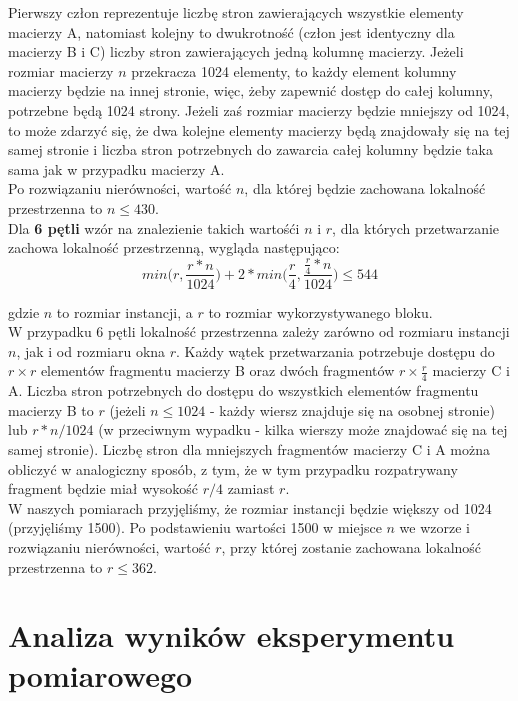 \documentclass[10pt,a4paper]{article}
\begin{document}
Pierwszy człon reprezentuje liczbę stron zawierających wszystkie elementy macierzy A, natomiast kolejny
to dwukrotność (człon jest identyczny dla macierzy B i C) liczby stron zawierających jedną kolumnę macierzy.
Jeżeli rozmiar macierzy $n$ przekracza 1024 elementy, to każdy element kolumny macierzy będzie na innej stronie,
więc, żeby zapewnić dostęp do całej kolumny, potrzebne będą 1024 strony. Jeżeli zaś rozmiar macierzy będzie
mniejszy od 1024, to może zdarzyć się, że dwa kolejne elementy macierzy będą znajdowały się na tej samej
stronie i liczba stron potrzebnych do zawarcia całej kolumny będzie taka sama jak w przypadku macierzy A.\\

Po rozwiązaniu nierówności, wartość $n$, dla której będzie zachowana lokalność przestrzenna to $n \leq 430$.
\\

Dla \textbf{6 pętli} wzór na znalezienie takich wartośći $n$ i $r$, dla których przetwarzanie zachowa
lokalność przestrzenną, wygląda następująco:
\begin{equation}
	min\Big(r, \frac{r*n}{1024}\Big) + 2*min\Big(\frac{r}{4}, \frac{\frac{r}{4} * n}{1024}\Big) \leq 544
\end{equation}

gdzie $n$ to rozmiar instancji, a $r$ to rozmiar wykorzystywanego bloku.\\

W przypadku 6 pętli lokalność przestrzenna zależy zarówno od rozmiaru instancji $n$, jak i od rozmiaru
okna $r$. Każdy wątek przetwarzania potrzebuje dostępu do $r \times r$ elementów fragmentu macierzy B oraz
dwóch fragmentów $r \times \frac{r}{4}$ macierzy C i A. Liczba stron potrzebnych do dostępu do wszystkich
elementów fragmentu macierzy B to $r$ (jeżeli $n \leq 1024$ - każdy wiersz znajduje się na osobnej stronie)
lub $r*n / 1024$ (w przeciwnym wypadku - kilka wierszy może znajdować się na tej samej stronie). Liczbę stron
dla mniejszych fragmentów macierzy C i A można obliczyć w analogiczny sposób, z tym, że w tym przypadku rozpatrywany
fragment będzie miał wysokość $r/4$ zamiast $r$.\\

W naszych pomiarach przyjęliśmy, że rozmiar instancji będzie większy od 1024 (przyjęliśmy 1500).
Po podstawieniu wartości 1500 w miejsce $n$ we wzorze i rozwiązaniu nierówności, wartość $r$, przy której
zostanie zachowana lokalność przestrzenna to $r \leq 362$.
\\
\section{Analiza wyników eksperymentu pomiarowego}
\end{document}
